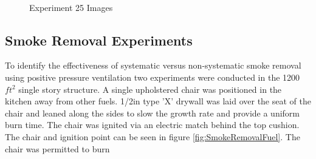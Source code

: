 \documentclass{article}
\begin{document}
\begin{figure}[H]
	\ContinuedFloat 
	\centering 
	 \ 
	\caption{Experiment 25 Images}
	\label{fig:Experiment25ImagesCont3} 
\end{figure}

\subsection{Smoke Removal Experiments}

To identify the effectiveness of systematic versus non-systematic smoke removal using positive pressure ventilation two experiments were conducted in the 1200 $ft^2$ single story structure. A single upholstered chair was positioned in the kitchen away from other fuels. 1/2in type 'X' drywall was laid over the seat of the chair and leaned along the sides to slow the growth rate and provide a uniform burn time. The chair was ignited via an electric match behind the top cushion. The chair and ignition point can be seen in figure \ref{fig:SmokeRemovalFuel}. The chair was permitted to burn 
\end{document}
